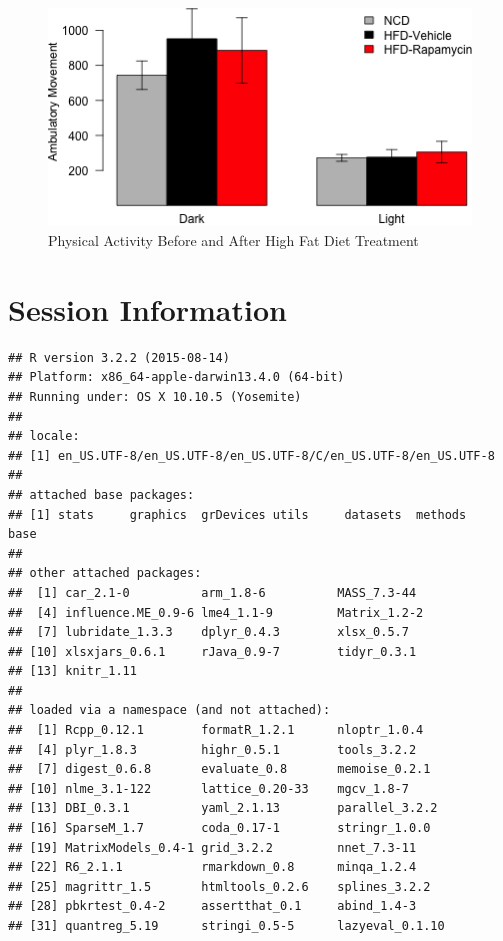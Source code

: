 \documentclass[]{article}
\begin{document}
\begin{figure}[htbp]
\centering
\includegraphics{figures/activity-barplot-1.png}
\caption{Physical Activity Before and After High Fat Diet Treatment}
\end{figure}

\section{Session Information}\label{session-information}

\begin{verbatim}
## R version 3.2.2 (2015-08-14)
## Platform: x86_64-apple-darwin13.4.0 (64-bit)
## Running under: OS X 10.10.5 (Yosemite)
## 
## locale:
## [1] en_US.UTF-8/en_US.UTF-8/en_US.UTF-8/C/en_US.UTF-8/en_US.UTF-8
## 
## attached base packages:
## [1] stats     graphics  grDevices utils     datasets  methods   base     
## 
## other attached packages:
##  [1] car_2.1-0          arm_1.8-6          MASS_7.3-44       
##  [4] influence.ME_0.9-6 lme4_1.1-9         Matrix_1.2-2      
##  [7] lubridate_1.3.3    dplyr_0.4.3        xlsx_0.5.7        
## [10] xlsxjars_0.6.1     rJava_0.9-7        tidyr_0.3.1       
## [13] knitr_1.11        
## 
## loaded via a namespace (and not attached):
##  [1] Rcpp_0.12.1        formatR_1.2.1      nloptr_1.0.4      
##  [4] plyr_1.8.3         highr_0.5.1        tools_3.2.2       
##  [7] digest_0.6.8       evaluate_0.8       memoise_0.2.1     
## [10] nlme_3.1-122       lattice_0.20-33    mgcv_1.8-7        
## [13] DBI_0.3.1          yaml_2.1.13        parallel_3.2.2    
## [16] SparseM_1.7        coda_0.17-1        stringr_1.0.0     
## [19] MatrixModels_0.4-1 grid_3.2.2         nnet_7.3-11       
## [22] R6_2.1.1           rmarkdown_0.8      minqa_1.2.4       
## [25] magrittr_1.5       htmltools_0.2.6    splines_3.2.2     
## [28] pbkrtest_0.4-2     assertthat_0.1     abind_1.4-3       
## [31] quantreg_5.19      stringi_0.5-5      lazyeval_0.1.10
\end{verbatim}
\end{document}
